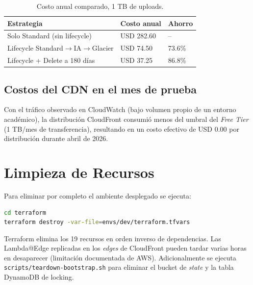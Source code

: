 \documentclass[12pt,a4paper]{report}
\begin{document}
\begin{table}[H]
    \centering
    \caption{Costo anual comparado, 1 TB de uploads.}
    \begin{tabular}{p{5cm}p{3cm}p{3cm}}
        \toprule
        \textbf{Estrategia} & \textbf{Costo anual} & \textbf{Ahorro} \\
        \midrule
        Solo Standard (sin lifecycle) & USD 282.60 & -- \\
        Lifecycle Standard$\rightarrow$IA$\rightarrow$Glacier & USD 74.50 & 73.6\% \\
        Lifecycle + Delete a 180 días & USD 37.25 & 86.8\% \\
        \bottomrule
    \end{tabular}
\end{table}

\subsection{Costos del CDN en el mes de prueba}

Con el tráfico observado en CloudWatch (bajo volumen propio de un entorno académico), la distribución CloudFront consumió menos del umbral del \textit{Free Tier} (1 TB/mes de transferencia), resultando en un costo efectivo de USD 0.00 por distribución durante abril de 2026.

\section{Limpieza de Recursos}

Para eliminar por completo el ambiente desplegado se ejecuta:

\begin{lstlisting}[language=bash]
cd terraform
terraform destroy -var-file=envs/dev/terraform.tfvars
\end{lstlisting}

Terraform elimina los 19 recursos en orden inverso de dependencias. Las Lambda@Edge replicadas en los \textit{edges} de CloudFront pueden tardar varias horas en desaparecer (limitación documentada de AWS). Adicionalmente se ejecuta \texttt{scripts/teardown-bootstrap.sh} para eliminar el bucket de \textit{state} y la tabla DynamoDB de locking.

\end{document}
